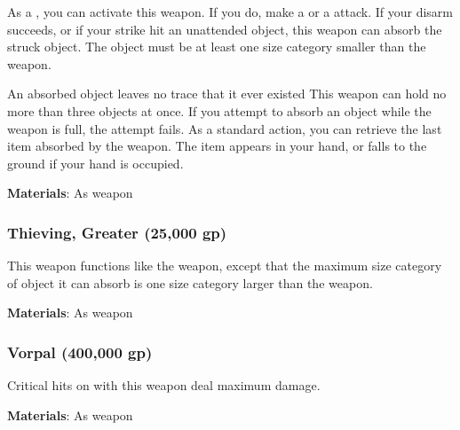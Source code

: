 As a , you can activate this weapon.
If you do, make a  or a  attack.
If your disarm succeeds, or if your strike hit an unattended object, this weapon can absorb the struck object.
The object must be at least one size category smaller than the weapon.

An absorbed object leaves no trace that it ever existed
This weapon can hold no more than three objects at once.
If you attempt to absorb an object while the weapon is full, the attempt fails.
As a standard action, you can retrieve the last item absorbed by the weapon.
The item appears in your hand, or falls to the ground if your hand is occupied.



\vspace{0.25em}
\textbf{Materials}: As weapon


\lowercase{\hypertarget{item:Thieving, Greater}{}}\label{item:Thieving, Greater}
\hypertarget{item:Thieving, Greater}{\subsubsection{Thieving, Greater\hfill{} (25,000 gp)}}

This weapon functions like the  weapon, except that the maximum size category of object it can absorb is one size category larger than the weapon.



\vspace{0.25em}
\textbf{Materials}: As weapon


\lowercase{\hypertarget{item:Vorpal}{}}\label{item:Vorpal}
\hypertarget{item:Vorpal}{\subsubsection{Vorpal\hfill{} (400,000 gp)}}

Critical hits on  with this weapon deal maximum damage.



\vspace{0.25em}
\textbf{Materials}: As weapon
